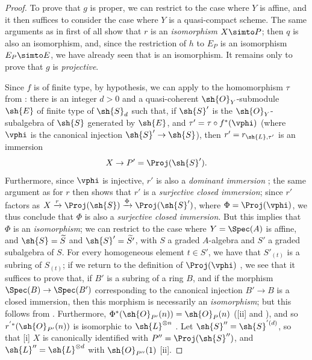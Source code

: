 \begin{proof}
To prove that $g$ is proper, we can restrict to the case where $Y$ is affine, and it then suffices to consider the case where $Y$ is a quasi-compact scheme.
The same arguments as in  first of all show that $r$ is an \emph{isomorphism} $X\simto P$;
then $q$ is also an isomorphism, and, since the restriction of $h$ to $E_P$ is an isomorphism $E_P\simto E$, we have already seen that  is an isomorphism.
It remains only to prove that $g$ is \emph{projective}.

Since $f$ is of finite type, by hypothesis, we can apply  to the homomorphism
$\tau$ from :
there is an integer $d>0$ and a quasi-coherent $\sh{O}_Y$-submodule $\sh{E}$ of finite type of $\sh{S}_d$ such that, if $\sh{S}'$ is the $\sh{O}_Y$-subalgebra of $\sh{S}$ generated by $\sh{E}$, and $\tau'=\tau\circ f^*(\vphi)$ (where $\vphi$ is the canonical injection $\sh{S}'\to\sh{S}$), then $r'=r_{\sh{L},\tau'}$ is an immersion
\[
  X\to P'=\Proj(\sh{S}').
\]
Furthermore, since $\vphi$ is injective, $r'$ is also a \emph{dominant immersion} ;
the same argument as for $r$ then shows that $r'$ is a \emph{surjective closed immersion};
since $r'$ factors as $X\xrightarrow{r}\Proj(\sh{S})\xrightarrow{\Phi}\Proj(\sh{S}')$, where $\Phi=\Proj(\vphi)$, we thus conclude that $\Phi$ is also a \emph{surjective closed immersion}.
But this implies that $\Phi$ is an \emph{isomorphism};
we can restrict to the case where $Y=\Spec(A)$ is affine, and $\sh{S}=\widetilde{S}$ and $\sh{S}'=\widetilde{S'}$, with $S$ a graded $A$-algebra and $S'$ a graded subalgebra of $S$.
For every homogeneous element $t\in S'$, we have that $S'_{(t)}$ is a subring of $S_{(t)}$;
if we return to the definition of $\Proj(\vphi)$ , we see that it suffices to prove that, if $B'$ is a subring of a ring $B$, and if the morphism $\Spec(B)\to\Spec(B')$ corresponding to the canonical injection $B'\to B$ is a closed immersion, then this morphism is necessarily an \emph{isomorphism};
but this follows from .
Furthermore, $\Phi^*(\sh{O}_{P'}(n))=\sh{O}_P(n)$ ([ii] and ), and so $r^{'*}(\sh{O}_{P'}(n))$ is isomorphic to $\sh{L}^{\otimes n}$ .
Let $\sh{S}''=\sh{S}^{'(d)}$, so that [i] $X$ is canonically identified with $P''=\Proj(\sh{S}'')$, and $\sh{L}''=\sh{L}^{\otimes d}$ with $\sh{O}_{P''}(1)$ [ii].


\end{proof}
